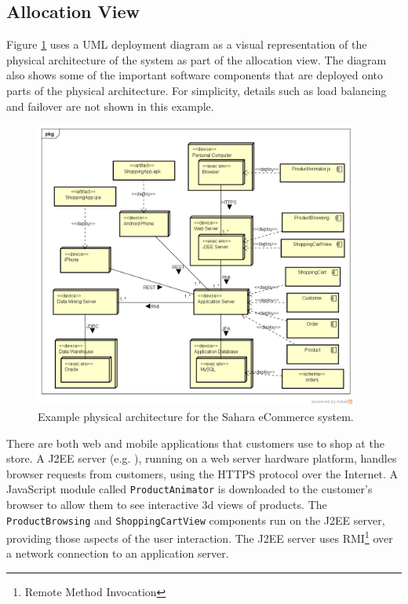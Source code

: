 
\subsection{Allocation View}\label{sec:storeAllocView}
Figure \ref{fig:deploymentDiagram} uses a UML deployment diagram as a visual representation of the physical architecture of the system as part of the allocation view.
The diagram also shows some of the important software components that are deployed onto parts of the physical architecture.
For simplicity, details such as load balancing and failover are not shown in this example.

\begin{figure}[h!]
    \centering
    \includegraphics[trim=38 38 23 44,clip,width=0.95\textwidth]{images/uml/deployment_diagram.png}
    \caption{Example physical architecture for the Sahara eCommerce system.}
    \label{fig:deploymentDiagram}
\end{figure}

There are both web and mobile applications that customers use to shop at the store.
A J2EE server (e.g. ), running on a web server hardware platform,
handles browser requests from customers, using the HTTPS protocol over the Internet.
A JavaScript module called \texttt{ProductAnimator} is downloaded to the customer's browser to allow them to see interactive 3d views of products.
The \texttt{ProductBrowsing} and \texttt{ShoppingCartView} components run on the J2EE server, providing those aspects of the user interaction.
The J2EE server uses RMI\footnote{Remote Method Invocation} over a network connection to an application server.

